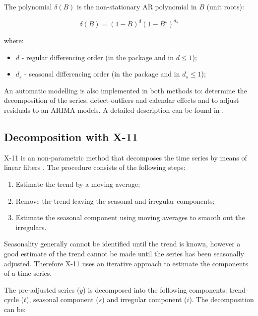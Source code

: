 \documentclass[article]{jss}
\providecommand{\tightlist}{%
  \setlength{\itemsep}{0pt}\setlength{\parskip}{0pt}}
\begin{document}
The polynomial \(\delta(B)\) is the non-stationary AR polynomial in
\(B\) (unit roots):

\[\delta(B)=(1-B)^d(1-B^s)^{d_s}\]

where:

\begin{itemize}
\tightlist
\item
  \(d\) - regular differencing order (in the package and in
   \(d \le 1\));
\item
  \(d_s\) - seasonal differencing order (in the package and in
   \(d_s \le 1\));
\end{itemize}

An automatic modelling is also implemented in both methods to: determine
the decomposition of the series, detect outliers and calendar effects
and to adjust residuals to an ARIMA models. A detailed description can
be found in \cite{gomez1998automatic}.

\hypertarget{sa-x11}{%
\subsection{Decomposition with X-11}\label{sa-x11}}

X-11 is an non-parametric method that decomposes the time series by
means of linear filters \citep{findleyx12, ladiray1999x11en}. The
procedure consists of the following steps:

\begin{enumerate}
\def\labelenumi{\arabic{enumi}.}
\tightlist
\item
  Estimate the trend by a moving average;\\
\item
  Remove the trend leaving the seasonal and irregular components;\\
\item
  Estimate the seasonal component using moving averages to smooth out
  the irregulars.
\end{enumerate}

Seasonality generally cannot be identified until the trend is known,
however a good estimate of the trend cannot be made until the series has
been seasonally adjusted. Therefore X-11 uses an iterative approach to
estimate the components of a time series.

The pre-adjusted series (\(y\)) is decomposed into the following
components: trend-cycle (\(t\)), seasonal component (\(s\)) and
irregular component (\(i\)). The decomposition can be:
\end{document}
